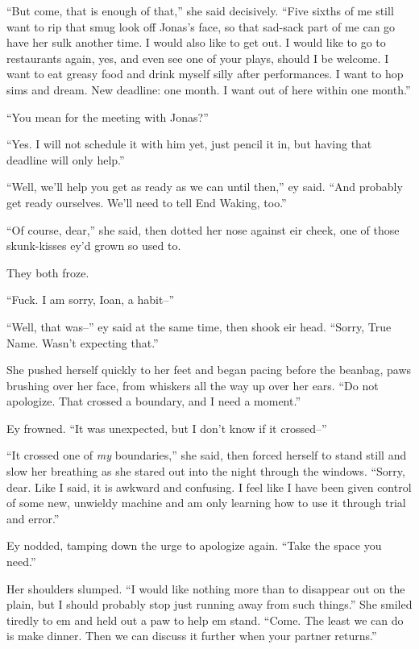 ``But come, that is enough of that,'' she said decisively. ``Five sixths of me still want to rip that smug look off Jonas's face, so that sad-sack part of me can go have her sulk another time. I would also like to get out. I would like to go to restaurants again, yes, and even see one of your plays, should I be welcome. I want to eat greasy food and drink myself silly after performances. I want to hop sims and dream. New deadline: one month. I want out of here within one month.''

``You mean for the meeting with Jonas?''

``Yes. I will not schedule it with him yet, just pencil it in, but having that deadline will only help.''

``Well, we'll help you get as ready as we can until then,'' ey said. ``And probably get ready ourselves. We'll need to tell End Waking, too.''

``Of course, dear,'' she said, then dotted her nose against eir cheek, one of those skunk-kisses ey'd grown so used to.

They both froze.

``Fuck. I am sorry, Ioan, a habit--''

``Well, that was--'' ey said at the same time, then shook eir head. ``Sorry, True Name. Wasn't expecting that.''

She pushed herself quickly to her feet and began pacing before the beanbag, paws brushing over her face, from whiskers all the way up over her ears. ``Do not apologize. That crossed a boundary, and I need a moment.''

Ey frowned. ``It was unexpected, but I don't know if it crossed--''

``It crossed one of \emph{my} boundaries,'' she said, then forced herself to stand still and slow her breathing as she stared out into the night through the windows. ``Sorry, dear. Like I said, it is awkward and confusing. I feel like I have been given control of some new, unwieldy machine and am only learning how to use it through trial and error.''

Ey nodded, tamping down the urge to apologize again. ``Take the space you need.''

Her shoulders slumped. ``I would like nothing more than to disappear out on the plain, but I should probably stop just running away from such things.'' She smiled tiredly to em and held out a paw to help em stand. ``Come. The least we can do is make dinner. Then we can discuss it further when your partner returns.''


